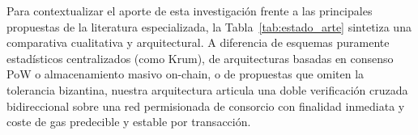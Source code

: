 Para contextualizar el aporte de esta investigación frente a las principales propuestas de la literatura especializada, la Tabla~\ref{tab:estado_arte} sintetiza una comparativa cualitativa y arquitectural. A diferencia de esquemas puramente estadísticos centralizados (como Krum), de arquitecturas basadas en consenso PoW o almacenamiento masivo on-chain, o de propuestas que omiten la tolerancia bizantina, nuestra arquitectura articula una doble verificación cruzada bidireccional sobre una red permisionada de consorcio con finalidad inmediata y coste de gas predecible y estable por transacción.


